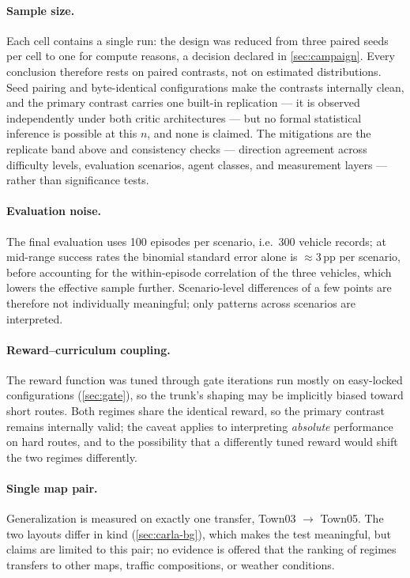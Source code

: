 \paragraph{Sample size.}
Each cell contains a single run: the design was reduced from three paired
seeds per cell to one for compute reasons, a decision declared in
\cref{sec:campaign}. Every conclusion therefore rests on paired
contrasts, not on estimated distributions. Seed pairing and
byte-identical configurations make the contrasts internally clean, and
the primary contrast carries one built-in replication --- it is observed
independently under both critic architectures --- but no formal
statistical inference is possible at this $n$, and none is claimed. The
mitigations are the replicate band above and consistency checks ---
direction agreement across difficulty levels, evaluation scenarios,
agent classes, and measurement layers --- rather than significance
tests.

\paragraph{Evaluation noise.}
The final evaluation uses 100 episodes per scenario, i.e.\ 300 vehicle
records; at mid-range success rates the binomial standard error alone is
$\approx$3\,pp per scenario, before accounting for the within-episode
correlation of the three vehicles, which lowers the effective sample
further. Scenario-level differences of a few points are therefore not
individually meaningful; only patterns across scenarios are interpreted.

\paragraph{Reward--curriculum coupling.}
The reward function was tuned through gate iterations run mostly on
easy-locked configurations (\cref{sec:gate}), so the trunk's shaping may
be implicitly biased toward short routes. Both regimes share the
identical reward, so the primary contrast remains internally valid; the
caveat applies to interpreting \emph{absolute} performance on hard
routes, and to the possibility that a differently tuned reward would
shift the two regimes differently.

\paragraph{Single map pair.}
Generalization is measured on exactly one transfer, Town03 $\to$ Town05.
The two layouts differ in kind (\cref{sec:carla-bg}), which makes the
test meaningful, but claims are limited to this pair; no evidence is
offered that the ranking of regimes transfers to other maps, traffic
compositions, or weather conditions.

